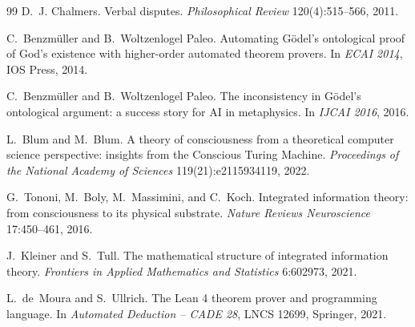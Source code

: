\documentclass[11pt]{article}
\theoremstyle{remark}
\begin{document}
\begin{thebibliography}{99}
 D.~J. Chalmers. Verbal disputes. \emph{Philosophical Review} 120(4):515--566, 2011.

 C.~Benzm\"uller and B.~Woltzenlogel Paleo. Automating G\"odel's ontological proof of God's existence with higher-order automated theorem provers. In \emph{ECAI 2014}, IOS Press, 2014.

 C.~Benzm\"uller and B.~Woltzenlogel Paleo. The inconsistency in G\"odel's ontological argument: a success story for AI in metaphysics. In \emph{IJCAI 2016}, 2016.

 L.~Blum and M.~Blum. A theory of consciousness from a theoretical computer science perspective: insights from the Conscious Turing Machine. \emph{Proceedings of the National Academy of Sciences} 119(21):e2115934119, 2022.

 G.~Tononi, M.~Boly, M.~Massimini, and C.~Koch. Integrated information theory: from consciousness to its physical substrate. \emph{Nature Reviews Neuroscience} 17:450--461, 2016.

 J.~Kleiner and S.~Tull. The mathematical structure of integrated information theory. \emph{Frontiers in Applied Mathematics and Statistics} 6:602973, 2021.

 L.~de~Moura and S.~Ullrich. The Lean 4 theorem prover and programming language. In \emph{Automated Deduction -- CADE 28}, LNCS 12699, Springer, 2021.

\end{thebibliography}
\end{document}
